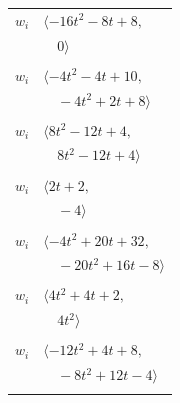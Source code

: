 \documentclass[11pt]{article}
\begin{document}
\begin{longtable}{@{}ll@{}}
$w_i$ & $\langle -16t^{2}-8t+8,$\\
 & $\quad 0\rangle$\\
\addlinespace[2pt]
\multicolumn{2}{@{}p{0.97\textwidth}@{}}{$i=10$, $D_i=2$, $\rho_{ij}$: $3{:}1, \allowbreak 4{:}1, \allowbreak 8{:}2, \allowbreak 18{:}1, \allowbreak 38{:}2, \allowbreak 39{:}1$}\\
$w_i$ & $\langle -4t^{2}-4t+10,$\\
 & $\quad -4t^{2}+2t+8\rangle$\\
\addlinespace[2pt]
\multicolumn{2}{@{}p{0.97\textwidth}@{}}{$i=11$, $D_i=4$, $\rho_{ij}$: $1{:}1, \allowbreak 2{:}2, \allowbreak 3{:}2, \allowbreak 4{:}1, \allowbreak 5{:}2, \allowbreak 7{:}1, \allowbreak 21{:}1, \allowbreak 36{:}2$}\\
$w_i$ & $\langle 8t^{2}-12t+4,$\\
 & $\quad 8t^{2}-12t+4\rangle$\\
\addlinespace[2pt]
\multicolumn{2}{@{}p{0.97\textwidth}@{}}{$i=12$, $D_i=2$, $\rho_{ij}$: $1{:}2, \allowbreak 3{:}1, \allowbreak 26{:}2, \allowbreak 34{:}1$}\\
$w_i$ & $\langle 2t+2,$\\
 & $\quad -4\rangle$\\
\addlinespace[2pt]
\multicolumn{2}{@{}p{0.97\textwidth}@{}}{$i=13$, $D_i=4$, $\rho_{ij}$: $1{:}1, \allowbreak 2{:}2, \allowbreak 6{:}2, \allowbreak 16{:}1, \allowbreak 19{:}2, \allowbreak 25{:}1, \allowbreak 38{:}1$}\\
$w_i$ & $\langle -4t^{2}+20t+32,$\\
 & $\quad -20t^{2}+16t-8\rangle$\\
\addlinespace[2pt]
\multicolumn{2}{@{}p{0.97\textwidth}@{}}{$i=14$, $D_i=2$, $\rho_{ij}$: $0{:}2, \allowbreak 2{:}2, \allowbreak 24{:}1, \allowbreak 26{:}2, \allowbreak 32{:}2, \allowbreak 35{:}2$}\\
$w_i$ & $\langle 4t^{2}+4t+2,$\\
 & $\quad 4t^{2}\rangle$\\
\addlinespace[2pt]
\multicolumn{2}{@{}p{0.97\textwidth}@{}}{$i=15$, $D_i=4$, $\rho_{ij}$: $1{:}2, \allowbreak 4{:}1, \allowbreak 6{:}1, \allowbreak 19{:}1, \allowbreak 26{:}1, \allowbreak 27{:}1, \allowbreak 29{:}1, \allowbreak 35{:}2, \allowbreak 38{:}1, \allowbreak 39{:}1$}\\
$w_i$ & $\langle -12t^{2}+4t+8,$\\
 & $\quad -8t^{2}+12t-4\rangle$\\
\addlinespace[2pt]
\multicolumn{2}{@{}p{0.97\textwidth}@{}}{$i=16$, $D_i=4$, $\rho_{ij}$: $2{:}1, \allowbreak 3{:}1, \allowbreak 5{:}1, \allowbreak 8{:}1, \allowbreak 13{:}2, \allowbreak 17{:}2, \allowbreak 24{:}1, \allowbreak 34{:}2, \allowbreak 37{:}1$}\\

\end{longtable}
\end{document}
